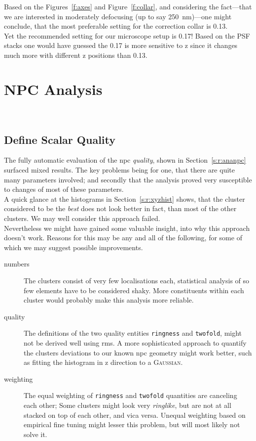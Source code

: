 \documentclass[11pt, a4paper, oneside, twocolumn]{report}
\renewcommand{\tt}{\texttt}
\renewcommand{\t}{\todo}
\newcommand{\e}{\emph}
\begin{document}
Based on the Figures~\ref{f:axes} and Figure~\ref{f:collar}, and
considering the fact---that we are interested in moderately defocusing
(up to say \SI{250}{\nano\meter})---one might conclude, that the most
preferable setting for the correction collar is 0.13. \t{why?}\\

Yet the recommended setting for our microscope setup is 0.17! Based on
the PSF stacks one would have guessed the 0.17 is more sensitive to z
since it changes much more with different z positions than 0.13.


\section{NPC Analysis}~\label{s:d:ananpc}


\subsection{Define Scalar Quality}

The fully automatic evaluation of the \gls{npc} \e{quality}, shown in
Section~\ref{s:r:ananpc} surfaced mixed results. The key problems
being for one, that there are quite many parameters involved; and
secondly that the analysis proved very susceptible to changes of most
of these parameters.\\

A quick glance at the histograms in Section~\ref{s:r:xyzhist} shows,
that the cluster considered to be the \e{best} does not look better in
fact, than most of the other clusters. We may well consider this
approach failed.\\

Nevertheless we might have gained some valuable insight, into why this
approach doesn't work. Reasons for this may be any and all of the
following, for some of which we may suggest possible improvements.

\begin{description}
\item [numbers] The clusters consist of very few localisations each,
  statistical analysis of so few elements have to be considered
  shaky. More constituents within each cluster would probably make
  this analysis more reliable.
\item [quality] The definitions of the two quality entities
  \tt{ringness} and \tt{twofold}, might not be derived well using
  \gls{rms}. A more sophisticated approach to quantify the clusters
  deviations to our known \gls{npc} geometry might work better, such
  as fitting the histogram in z direction to a \textsc{Gaussian}.
\item [weighting] The equal weighting of \tt{ringness} and
  \tt{twofold} quantities are canceling each other; Some clusters
  might look very \e{ringlike}, but are not at all stacked on top of
  each other, and vica versa. Unequal weighting based on empirical
  fine tuning might lesser this problem, but will most likely not
  solve it.
\end{description}
\end{document}
